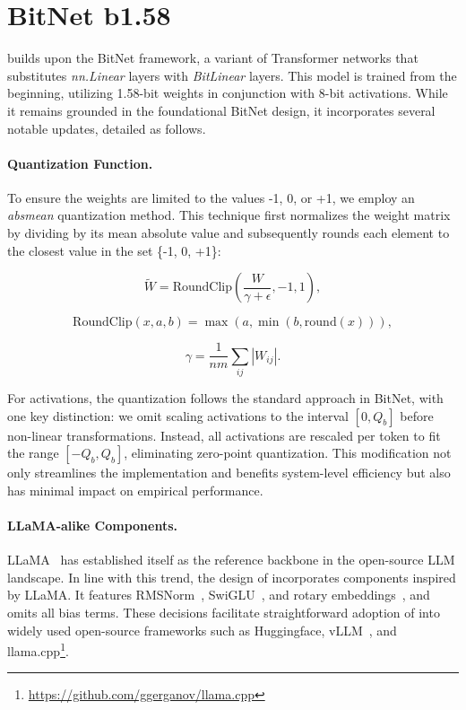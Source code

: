 \section{BitNet b1.58}

 builds upon the BitNet framework, a variant of Transformer networks that substitutes \emph{nn.Linear} layers with \emph{BitLinear} layers. This model is trained from the beginning, utilizing 1.58-bit weights in conjunction with 8-bit activations. While it remains grounded in the foundational BitNet design, it incorporates several notable updates, detailed as follows.

\paragraph{Quantization Function.} To ensure the weights are limited to the values -1, 0, or +1, we employ an \emph{absmean} quantization method. This technique first normalizes the weight matrix by dividing by its mean absolute value and subsequently rounds each element to the closest value in the set \{-1, 0, +1\}:

\begin{equation}
    \widetilde{W} = \mathrm{RoundClip}(\frac{W}{\gamma + \epsilon}, -1, 1),
\end{equation}

\begin{equation}
    \mathrm{RoundClip}(x, a, b) = \max(a, \min(b, \mathrm{round}(x))),
\end{equation}

\begin{equation}
    \gamma = \frac{1}{nm}\sum_{ij} |W_{ij}|.
\end{equation}

For activations, the quantization follows the standard approach in BitNet, with one key distinction: we omit scaling activations to the interval $[0, Q_b]$ before non-linear transformations. Instead, all activations are rescaled per token to fit the range $[-Q_b, Q_b]$, eliminating zero-point quantization. This modification not only streamlines the implementation and benefits system-level efficiency but also has minimal impact on empirical performance.

\paragraph{LLaMA-alike Components.}

LLaMA~\cite{llama, llama2} has established itself as the reference backbone in the open-source LLM landscape. In line with this trend, the design of  incorporates components inspired by LLaMA. It features RMSNorm~\cite{rmsnorm}, SwiGLU~\cite{swiglu}, and rotary embeddings~\cite{rope}, and omits all bias terms. These decisions facilitate straightforward adoption of  into widely used open-source frameworks such as Huggingface, vLLM~\cite{vllm}, and llama.cpp\footnote{\url{https://github.com/ggerganov/llama.cpp}}.

